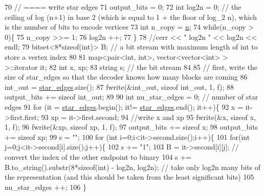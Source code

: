 \begin{DoxyCode}
70   \textcolor{comment}{// ==== write star edges}
71   output\_bits = 0;
72   \textcolor{keywordtype}{int} log2n = 0; \textcolor{comment}{// the ceiling of log (n+1) in base 2 (which is equal to 1 + the floor of log\_2 n), which
       is the number of bits to encode vertices}
73   \textcolor{keywordtype}{int} n\_copy = \hyperlink{classmarked__graph__compressed_a8d841016ddb11cfd33748c8deb6277ba}{n};
74   \textcolor{keywordflow}{while}(n\_copy > 0)\{
75     n\_copy >>= 1;
76     log2n ++;
77   \}
78   \textcolor{comment}{//cerr << " log2n " << log2n << endl;}
79   bitset<8*sizeof(int)> B; \textcolor{comment}{// a bit stream with maximum length of int to store a vertex index}
80 
81   map<pair<int, int>, vector<vector<int> > >::iterator it;
82   \textcolor{keywordtype}{int} x, xp;
83   \textcolor{keywordtype}{string} s; \textcolor{comment}{// the bit stream}
84 
85   \textcolor{comment}{// first, write the size of star\_edges so that the decoder knows how many blocks are coming}
86   int\_out = \hyperlink{classmarked__graph__compressed_a7df5779d313486644132bd816937f532}{star\_edges}.size();
87   fwrite(&int\_out, \textcolor{keyword}{sizeof} int\_out, 1, f);
88   output\_bits += \textcolor{keyword}{sizeof} int\_out;
89 
90   \textcolor{keywordtype}{int} nu\_star\_edges = 0; \textcolor{comment}{// number of star edges }
91   \textcolor{keywordflow}{for} (it = \hyperlink{classmarked__graph__compressed_a7df5779d313486644132bd816937f532}{star\_edges}.begin(); it!= \hyperlink{classmarked__graph__compressed_a7df5779d313486644132bd816937f532}{star\_edges}.end(); it++)\{
92     x = it->first.first;
93     xp = it->first.second;
94     \textcolor{comment}{//write x and xp}
95     fwrite(&x, \textcolor{keyword}{sizeof} x, 1, f);
96     fwrite(&xp, \textcolor{keyword}{sizeof} xp, 1, f);
97     output\_bits += \textcolor{keyword}{sizeof} x;
98     output\_bits += \textcolor{keyword}{sizeof} xp;
99     s = \textcolor{stringliteral}{""};
100     \textcolor{keywordflow}{for} (\textcolor{keywordtype}{int} i=0;i<it->second.size();i++)\{
101       \textcolor{keywordflow}{for}(\textcolor{keywordtype}{int} j=0;j<it->second[i].size();j++)\{
102         s += \textcolor{stringliteral}{"1"};
103         B = it->second[i][j]; \textcolor{comment}{// convert the index of the other endpoint to binary}
104         s += B.to\_string().substr(8*\textcolor{keyword}{sizeof}(\textcolor{keywordtype}{int}) - log2n, log2n); \textcolor{comment}{// take only log2n many bits of the
       representation (and this should be taken from the least significant bits)}
105         nu\_star\_edges ++;
106       \}

\end{DoxyCode}
